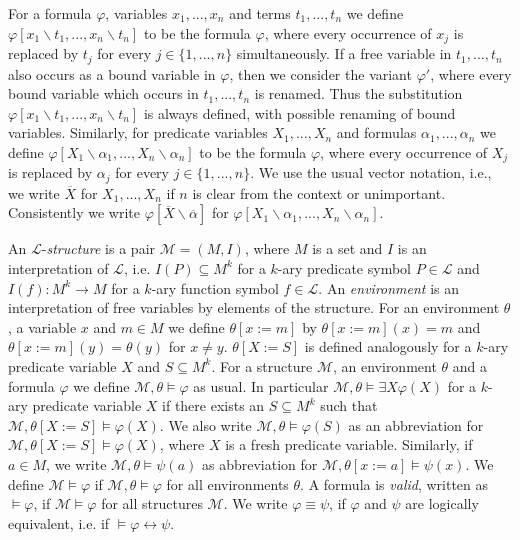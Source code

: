 \documentclass[acmsmall]{acmart}
\theoremstyle{plain}
\theoremstyle{definition}
\newcommand{\calM}{\mathcal{M}}
\renewcommand{\phi}{\varphi}
\newcommand{\mybar}[1]{\overline{#1}}
\begin{document}
For a formula $\varphi$, variables $x_1,...,x_n$ and terms $t_1,...,t_n$ we define
 $\varphi[x_1\backslash t_1,...,x_n \backslash t_n]$ to be the formula $\varphi$, where
 every occurrence of $x_j$ is replaced by $t_j$ for every $j \in \{1,...,n\}$ simultaneously.
If a free variable in $t_1,...,t_n$ also occurs as a bound variable in $\varphi$, then we consider
 the variant $\varphi'$, where every bound variable which occurs in $t_1,...,t_n$ is renamed.
Thus the substitution $\varphi[x_1\backslash t_1,...,x_n \backslash t_n]$ is always defined, with
 possible renaming of bound variables.
Similarly, for predicate variables $X_1,...,X_n$ and formulas
 $\alpha_1,...,\alpha_n$ we define $\varphi[X_1 \backslash \alpha_1,...,X_n \backslash \alpha_n]$ to
 be the formula $\varphi$, where every occurrence of $X_j$ is replaced by $\alpha_j$ for every
 $j \in \{1,...,n\}$.
We use the usual vector notation, i.e., we write $\mybar{X}$ for $X_1,...,X_n$ if $n$ is clear from
 the context or unimportant.
Consistently we write $\varphi[\mybar{X} \backslash \mybar{\alpha}]$ for $\varphi[X_1 \backslash \alpha_1,...,X_n \backslash \alpha_n]$.

An $\mathcal{L}$-\emph{structure} is a pair $\mathcal{M} = (M,I)$, where $M$ is a set and $I$ is an interpretation of $\mathcal{L}$, i.e. $I(P) \subseteq M^k$ for a $k$-ary predicate symbol $P \in \mathcal{L}$ and $I(f): M^k \rightarrow M$ for a $k$-ary function symbol $f \in \mathcal{L}$.
An \emph{environment} is an interpretation of free variables by elements of the
 structure.
For an environment $\theta$, a variable $x$ and $m \in M$ we define $\theta[x:=m]$ by
 $\theta[x:=m](x) = m$ and $\theta[x:=m](y) = \theta(y)$ for $x \neq y$. $\theta[X:=S]$
 is defined analogously for a $k$-ary predicate variable $X$ and $S \subseteq M^k$.
For a structure $\mathcal{M}$, an environment $\theta$ and a formula $\varphi$ we define $\mathcal{M},\theta \models \varphi$ as usual. In particular $\mathcal{M},\theta \models \exists X \varphi(X)$ for a $k$-ary predicate variable $X$ if there exists an $S \subseteq M^k$ such that $\mathcal{M},\theta[X:=S] \models \varphi(X)$. We also write $\calM,\theta \models \phi(S)$ as an abbreviation for $\mathcal{M},\theta[X:=S] \models \varphi(X)$, where $X$ is a fresh predicate variable.
Similarly, if $a \in M$, we write $\mathcal{M}, \theta \models \psi(a)$ as abbreviation
 for $\mathcal{M}, \theta[x:=a] \models \psi(x)$.
We define $\mathcal{M} \models \varphi$ if $\mathcal{M},\theta \models \varphi$ for all environments $\theta$. A formula is \emph{valid}, written as $\models \varphi$, if $\mathcal{M} \models \varphi$ for all structures $\mathcal{M}$. We write $\varphi \equiv \psi$, if $\varphi$ and $\psi$ are logically equivalent, i.e. if $\models \varphi \leftrightarrow \psi$.
\end{document}
